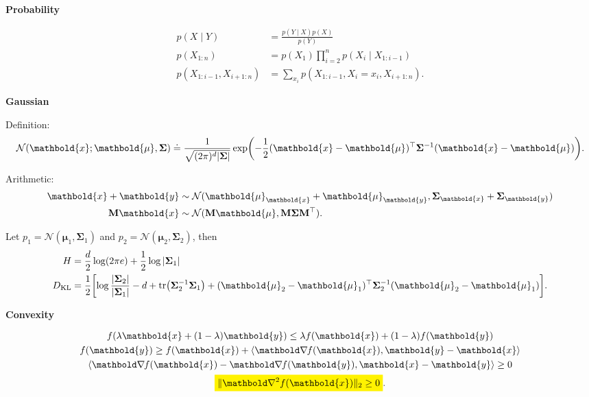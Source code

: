 \documentclass[10pt]{article}
\newenvironment{subtopic}[1]
{\begin{center}\textbf{\footnotesize \sffamily #1}\end{center}}
{}
\renewcommand{\det}[1]{|#1|}
\renewcommand{\mat}[1]{\ensuremath{\mathbf{#1}}}
\renewcommand{\vec}[1]{\ensuremath{\mathbold{#1}}}
\newcommand{\Break}{\vfill\null\columnbreak}
\begin{document}
\begin{multicols*}{3}
    \begin{subtopic}{Probability}
        \begin{align*}
            p(X \mid Y) & = \frac{p(Y \mid X) p(X)}{p(Y)} \\
            p(X_{1:n}) & = p(X_1) \prod_{i=2}^n p(X_i \mid X_{1:i-1}) \\
            p(X_{1:i-1},X_{i+1:n}) & = \sum_{x_i} p(X_{1:i-1}, X_i=x_i, X_{i+1:n}).
        \end{align*}
    \end{subtopic}

    \Break

    \begin{subtopic}{Gaussian}
        Definition: \[
            \mathcal{N}(\vec{x}; \vec{\mu}, \mat{\Sigma}) \doteq \frac{1}{\sqrt{(2\pi)^{d} \det{\mat{\Sigma}}}} \exp \lft( -\frac{1}{2} \transpose{(\vec{x}-\vec{\mu})} \inv{\mat{\Sigma}} (\vec{x} - \vec{\mu}) \rgt).
        \]

        Arithmetic:
        \begin{align*}
            \vec{x} + \vec{y} & \sim \mathcal{N}(\vec{\mu}_{\vec{x}} + \vec{\mu}_{\vec{y}}, \mat{\Sigma}_{\vec{x}} + \mat{\Sigma}_{\vec{y}})      \\
            \mat{M} \vec{x} & \sim \mathcal{N}(\mat{M} \vec{\mu}, \mat{M}\mat{\Sigma}\transpose{\mat{M}}).
        \end{align*}

        Let $p_1 = \mathcal{N}(\vec{\mu}_1, \mat{\Sigma}_1)$ and $p_2 = \mathcal{N}(\vec{\mu}_2, \mat{\Sigma}_2)$, then
        \begin{align*}
            H & = \frac{d}{2} \log(2\pi e) + \frac{1}{2} \log \det{\mat{\Sigma}_1} \\
            D_{\mathrm{KL}} & = \frac{1}{2} \biggl[ \log \frac{\det{\mat{\Sigma}_2}}{\det{\mat{\Sigma}_1}} - d + \tr{\inv{\mat{\Sigma}_2} \mat{\Sigma}_1} + \transpose{(\vec{\mu}_2 - \vec{\mu}_1)} \inv{\mat{\Sigma}_2} (\vec{\mu}_2 - \vec{\mu}_1) \biggr].
        \end{align*}
    \end{subtopic}

    \begin{subtopic}{Convexity}
        \begin{gather*}
            f(\lambda \vec{x} + (1-\lambda) \vec{y}) \leq \lambda f(\vec{x}) + (1-\lambda) f(\vec{y}) \\
            f(\vec{y}) \geq f(\vec{x}) + \langle \grad{f(\vec{x})}{}, \vec{y} - \vec{x} \rangle       \\
            \langle \grad{f(\vec{x})}{} - \grad{f(\vec{y})}{}, \vec{x} - \vec{y} \rangle \geq 0       \\
            \colorbox{yellow}{$\displaystyle \| \hess{f(\vec{x})}{} \|_2 \geq 0$}.
        \end{gather*}
    \end{subtopic}


\end{multicols*}
\end{document}
